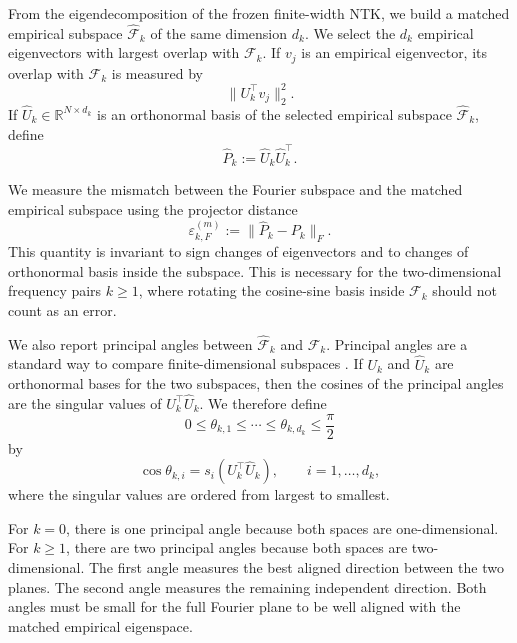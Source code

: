 From the eigendecomposition of the frozen finite-width NTK, we
build a matched empirical subspace \(\widehat{\mathcal F}_k\) of the same
dimension \(d_k\). We select the \(d_k\) empirical eigenvectors with largest
overlap with \(\mathcal F_k\). If \(v_j\) is an empirical eigenvector, its
overlap with \(\mathcal F_k\) is measured by
\[
	\|U_k^\top v_j\|_2^2.
\]
If \(\widehat U_k\in\mathbb R^{N\times d_k}\) is an orthonormal basis of the
selected empirical subspace \(\widehat{\mathcal F}_k\), define
\begin{equation}
	\widehat P_k := \widehat U_k\widehat U_k^\top .
	\label{eq:method-empirical-projector}
\end{equation}

We measure the mismatch between the Fourier subspace and the matched empirical
subspace using the projector distance
\begin{equation}
	\varepsilon_{k,F}^{(m)}
	:=
	\|\widehat P_k-P_k\|_F .
	\label{eq:method-projector-errors}
\end{equation}
This quantity is invariant to sign changes of eigenvectors and to changes of
orthonormal basis inside the subspace. This is necessary for the
two-dimensional frequency pairs \(k\ge 1\), where rotating the cosine-sine basis
inside \(\mathcal F_k\) should not count as an error.

We also report principal angles between
\(\widehat{\mathcal F}_k\) and \(\mathcal F_k\). Principal angles are a standard
way to compare finite-dimensional subspaces
\citep{bjorck1973numerical}. If \(U_k\) and \(\widehat U_k\) are orthonormal
bases for the two subspaces, then the cosines of the principal angles are the
singular values of \(U_k^\top \widehat U_k\). We therefore define
\[
	0\le \theta_{k,1}\le \cdots \le \theta_{k,d_k}\le \frac{\pi}{2}
\]
by
\begin{equation}
	\cos\theta_{k,i}
	=
	s_i(U_k^\top \widehat U_k),
	\qquad i=1,\dots,d_k,
	\label{eq:method-principal-angles}
\end{equation}
where the singular values are ordered from largest to smallest.

For \(k=0\), there is one principal angle because both spaces are
one-dimensional. For \(k\ge 1\), there are two principal angles because both
spaces are two-dimensional. The first angle measures the best aligned direction
between the two planes. The second angle measures the remaining independent
direction. Both angles must be small for the full Fourier plane to be well
aligned with the matched empirical eigenspace.

